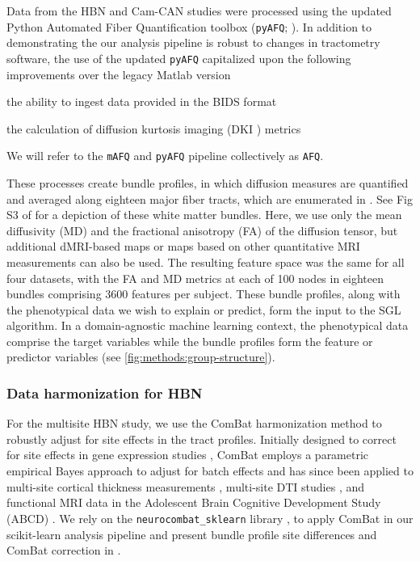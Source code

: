 \documentclass[10pt,letterpaper]{article}
\begin{document}
Data from the HBN and Cam-CAN studies were processed using the updated Python
Automated Fiber Quantification toolbox (\texttt{pyAFQ}; \cite{kruper2021evaluating}). In
addition to demonstrating the our analysis pipeline is robust to changes in
tractometry software, the use of the updated \texttt{pyAFQ} capitalized upon
the following improvements over the legacy Matlab version
\begin{enumerate*}[%
    label=(\roman*),%
    before=\unskip{: },%
    itemjoin={{, }},%
    itemjoin*={{, and }}]
    \item the ability to ingest data provided in the BIDS format
    \cite{gorgolewski2016brain}
    \item the calculation of diffusion kurtosis imaging (DKI
    \cite{jensen2005diffusion}) metrics
\end{enumerate*}
We will refer to the \texttt{mAFQ} and \texttt{pyAFQ} pipeline collectively
as \texttt{AFQ}.

These processes create bundle profiles, in which diffusion measures
are quantified and averaged along eighteen major fiber tracts,
which are enumerated in .
See Fig S3 of \cite{kruper2021evaluating} for a depiction of these white matter bundles.
Here,
we use only the mean diffusivity (MD) and the fractional anisotropy
(FA) of the diffusion tensor, but additional dMRI-based maps or maps
based on other quantitative MRI measurements can also be used.
The resulting feature space was the same for all four datasets, with the FA and MD metrics at each of 100 nodes in eighteen bundles comprising 3600 features per subject.
These bundle profiles, along with the phenotypical data we wish to explain
or predict, form the input to the SGL algorithm. In a domain-agnostic
machine learning context, the phenotypical data comprise the target
variables while the bundle profiles form the feature or predictor
variables (see \cref{fig:methods:group-structure}).

\subsubsection*{Data harmonization for HBN}

For the multisite HBN study, we use the ComBat harmonization method to robustly adjust for site effects in the tract profiles. Initially designed to correct for site effects in gene expression studies \cite{johnson2007adjusting}, ComBat employs a parametric empirical Bayes approach to adjust for batch effects and has since been applied to multi-site cortical thickness measurements \cite{fortin2018harmonization}, multi-site DTI studies \cite{fortin2017harmonization}, and functional MRI data in the Adolescent Brain Cognitive Development Study (ABCD) \cite{nielson2018detecting}. We rely on the \texttt{neurocombat\_sklearn} library \cite{neurocombat_sklearn}, to apply ComBat in our scikit-learn analysis pipeline and present bundle profile site differences and ComBat correction in .
\end{document}
